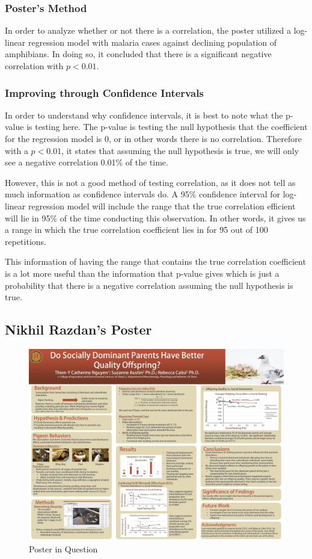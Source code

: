 \documentclass[12pt]{article}
\begin{document}
\subsubsection{Poster's Method}
In order to analyze whether or not there is a correlation, the poster utilized a log-linear regression model with malaria cases against declining population of amphibians. In doing so, it concluded that there is a significant negative correlation with $p < 0.01$.

\subsubsection{Improving through Confidence Intervals} 
In order to understand why confidence intervals, it is best to note what the p-value is testing here. The p-value is testing the null hypothesis that the coefficient for the regression model is 0, or in other words there is no correlation. Therefore with a $p < 0.01$, it states that assuming the null hypothesis is true, we will only see a negative correlation 0.01\% of the time.

However, this is not a good method of testing correlation, as it does not tell as much information as confidence intervals do. A 95\% confidence interval for log-linear regression model will include the range that the true correlation efficient will lie in 95\% of the time conducting this observation. In other words, it gives us a range in which the true correlation coefficient lies in for 95 out of 100 repetitions.

This information of having the range that contains the true correlation coefficient is a lot more useful than the information that p-value gives which is just a probability that there is a negative correlation assuming the null hypothesis is true.

\newpage
\subsection{Nikhil Razdan's Poster}
\begin{figure}
	\centering
  	\includegraphics[width=150mm]{nikhil_poster.jpg}
 	\caption{Poster in Question}
 	\label{fig:Nikhil_poster}
\end{figure}
\end{document}
